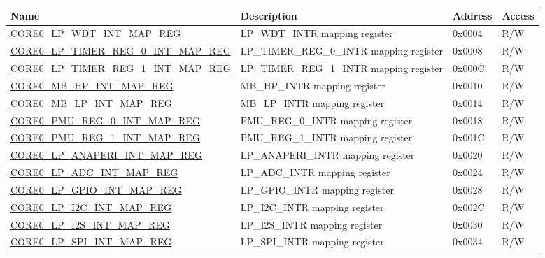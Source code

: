\begin{longtable}{ | p{7.5cm} | p{7.2cm} | p{1.3cm} | p{1cm} | }
\hline\rowcolor{lightgray}
Name & Description &  Address & Access \\ \hline
\endhead
\hyperref[regdesc:CORE0LPWDTINTMAPREG]{CORE0\_LP\_WDT\_INT\_MAP\_REG} & LP\_WDT\_INTR mapping register & 0x0004 & R/W \\ \hline
\hyperref[regdesc:CORE0LPTIMERREG0INTMAPREG]{CORE0\_LP\_TIMER\_REG\_0\_INT\_MAP\_REG} & LP\_TIMER\_REG\_0\_INTR mapping register & 0x0008 & R/W \\ \hline
\hyperref[regdesc:CORE0LPTIMERREG1INTMAPREG]{CORE0\_LP\_TIMER\_REG\_1\_INT\_MAP\_REG} & LP\_TIMER\_REG\_1\_INTR mapping register & 0x000C & R/W \\ \hline
\hyperref[regdesc:CORE0MBHPINTMAPREG]{CORE0\_MB\_HP\_INT\_MAP\_REG} & MB\_HP\_INTR mapping register & 0x0010 & R/W \\ \hline
\hyperref[regdesc:CORE0MBLPINTMAPREG]{CORE0\_MB\_LP\_INT\_MAP\_REG} & MB\_LP\_INTR mapping register & 0x0014 & R/W \\ \hline
\hyperref[regdesc:CORE0PMUREG0INTMAPREG]{CORE0\_PMU\_REG\_0\_INT\_MAP\_REG} & PMU\_REG\_0\_INTR mapping register & 0x0018 & R/W \\ \hline
\hyperref[regdesc:CORE0PMUREG1INTMAPREG]{CORE0\_PMU\_REG\_1\_INT\_MAP\_REG} & PMU\_REG\_1\_INTR mapping register & 0x001C & R/W \\ \hline

\hyperref[regdesc:CORE0LPANAPERIINTMAPREG]{CORE0\_LP\_ANAPERI\_INT\_MAP\_REG} & LP\_ANAPERI\_INTR mapping register & 0x0020 & R/W \\ \hline

\hyperref[regdesc:CORE0LPADCINTMAPREG]{CORE0\_LP\_ADC\_INT\_MAP\_REG} & LP\_ADC\_INTR mapping register & 0x0024 & R/W \\ \hline

\hyperref[regdesc:CORE0LPGPIOINTMAPREG]{CORE0\_LP\_GPIO\_INT\_MAP\_REG} & LP\_GPIO\_INTR mapping register & 0x0028 & R/W \\ \hline

\hyperref[regdesc:CORE0LPI2CINTMAPREG]{CORE0\_LP\_I2C\_INT\_MAP\_REG} & LP\_I2C\_INTR mapping register & 0x002C & R/W \\ \hline

\hyperref[regdesc:CORE0LPI2SINTMAPREG]{CORE0\_LP\_I2S\_INT\_MAP\_REG} & LP\_I2S\_INTR mapping register & 0x0030 & R/W \\ \hline

\hyperref[regdesc:CORE0LPSPIINTMAPREG]{CORE0\_LP\_SPI\_INT\_MAP\_REG} & LP\_SPI\_INTR mapping register & 0x0034 & R/W \\ \hline


\end{longtable}
